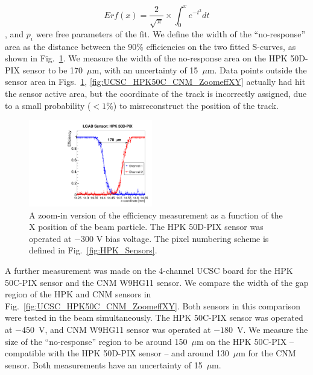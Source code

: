 \documentclass[preprint,1p]{elsarticle}
\begin{document}
\begin{equation} Erf(x)= \frac{2}{\sqrt{\pi}}\times \int_{0}^{x}e^{-t^2}dt
\end{equation} , and $p_i$ were free parameters of the fit. We define the width
of the ``no-response'' area as the distance between the 90\% efficiencies on the two
fitted S-curves, as shown in Fig.~\ref{fig:FNAL_HPK50_ZoomeffXY}. We measure the
width of the no-response area on the HPK 50D-PIX sensor to be 170~$\mu$m, with
an uncertainty of 15~$\mu$m. Data points outside the sensor area in
Figs.~\ref{fig:FNAL_HPK50_ZoomeffXY}, \ref{fig:UCSC_HPK50C_CNM_ZoomeffXY}
actually had hit the sensor active area, but the coordinate of the track is incorrectly
assigned, due to a small probability ($<1$\%) to misreconstruct the position of
the track.


\begin{figure}[!htbp] 
\centering
\includegraphics[width=0.48\textwidth]{figs/KUBoard_HPK50DPix_Run638-781/Eff_vs_X_HPK50DPIX_Ch1_2_fit.pdf} 
\caption{A zoom-in version of the efficiency measurement as a function of the X position of the beam particle.
The HPK 50D-PIX sensor was operated at $-300$ V bias voltage. The pixel numbering scheme is defined in Fig.~\ref{fig:HPK_Sensors}.} 
\label{fig:FNAL_HPK50_ZoomeffXY} 
\end{figure} 

A further measurement was made on the 4-channel UCSC board for the HPK 50C-PIX
sensor and the CNM W9HG11 sensor. We compare the width of the gap region of the
HPK and CNM sensors in Fig.~\ref{fig:UCSC_HPK50C_CNM_ZoomeffXY}. Both sensors in
this comparison were tested in the beam simultaneously. The HPK 50C-PIX sensor
was operated at $-450$~V, and CNM W9HG11 sensor was operated at $-180$~V. We
measure the size of the ``no-response'' region to be around 150~$\mu$m on the
HPK 50C-PIX -- compatible with the HPK 50D-PIX sensor -- and around 130~$\mu$m
for the CNM sensor. Both measurements have an uncertainty of 15~$\mu$m.
\end{document}
